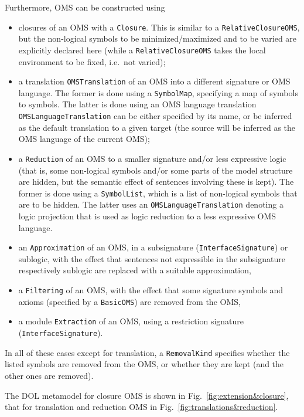 \documentclass[10pt,fleqn,final]{scrreprt}
\newcommand*{\termref}[1]{\index{#1}#1\xspace}
\newcommand*{\syntax}[1]{\texttt{#1}}
\newenvironment{definitions}[0]{\medskip }{}
\begin{document}
\begin{definitions}
Furthermore, OMS can be constructed using 
\begin{itemize}
\item  closures of an OMS with a \syntax{Closure}.  This is
  similar to a \syntax{RelativeClosureOMS}, but the non-logical
  symbols to be  minimized/maximized and to be varied are
  explicitly declared here (while a \syntax{RelativeClosureOMS} takes
  the local environment to be fixed, i.e.\ not varied);
\item a translation \syntax{OMSTranslation} of an OMS into a different
  signature or OMS language. The former is done using a \syntax{SymbolMap},
  specifying a map of symbols to symbols. The latter is done using an 
  OMS language
  translation \syntax{OMSLanguageTranslation} can be either specified
  by its name, or be inferred as the \termref{default translation} to
  a given target (the source will be inferred as the OMS language of
  the current OMS);
\item a \syntax{Reduction} of an OMS to a smaller signature and/or
  less expressive logic (that is, some non-logical symbols and/or some
  parts of the model structure are hidden, but the semantic effect of
  sentences involving these is kept). The former is done using a
  \syntax{SymbolList}, which is a list of non-logical symbols that are
  to be hidden. The latter uses an \syntax{OMSLanguageTranslation}
  denoting a logic projection that is used as logic reduction to a
  less expressive OMS language.
\item an \syntax{Approximation} of an OMS, in a subsignature (\syntax{InterfaceSignature}) or sublogic, with the effect that sentences not expressible in the subsignature respectively sublogic are replaced with a suitable approximation,
\item a \syntax{Filtering} of an OMS, with the effect that some signature symbols and axioms (specified by a \syntax{BasicOMS}) are removed from the OMS,
\item a module \syntax{Extraction} of an OMS, using a restriction signature (\syntax{InterfaceSignature}).
\end{itemize}
In all of these cases except for translation, a \syntax{RemovalKind}
specifies whether the listed symbols are removed from the OMS, or
whether they are kept (and the other ones are removed).

The DOL metamodel for closure OMS is shown in
Fig.~\ref{fig:extension&closure}, that for translation and reduction
OMS in Fig.~\ref{fig:translations&reduction}. 




\end{definitions}
\end{document}
